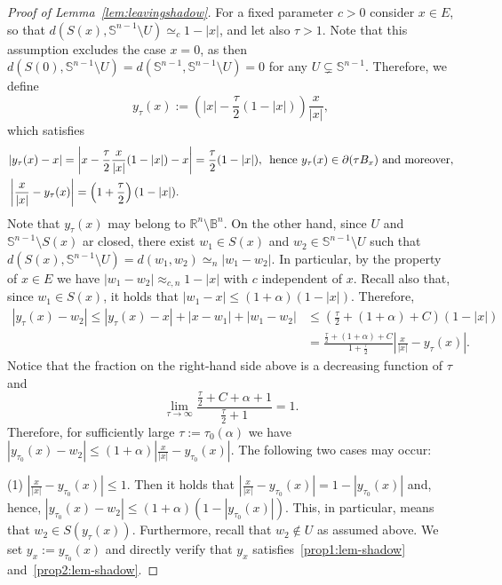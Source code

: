 \documentclass[11pt,a4paper,reqno]{amsart}
\theoremstyle{definition}
\newcommand{\B}{\mathbb{B}^n}
\newcommand{\Rn}{{\mathbb R}^n}
\newcommand{\Sn}{\mathbb{S}^{n-1}}
\numberwithin{komcounter}{section}
\begin{document}
\begin{appendix}
\begin{proof}[Proof of Lemma~\ref{lem:leavingshadow}]
	For a fixed parameter $c>0$ consider $x\in E$, so that $d(S(x),\Sn\setminus U)\simeq_c 1-|x|$, and let also $\tau >1$. Note that this assumption excludes the case $x=0$, as then $d(S(0),\Sn\setminus U)=d(\Sn,\Sn\setminus U)=0$ for any $U\subsetneq \Sn$. Therefore, we define
	\begin{equation}\label{def:y-tau}
	 y_\tau(x) :=\left( |x|-\frac{\tau}{2}(1-|x|)\right) \frac{x}{|x|},
	\end{equation}
	which satisfies 
	\begin{align*}
	&|y_\tau(x) -x|= \left| x- \frac{\tau}{2}\frac{x}{|x|}(1-|x|) -x \right| =\frac{\tau}{2}(1-|x|),\,\hbox{ hence } y_\tau(x)\in \partial(\tau B_x) \hbox{ and moreover},\\
	&\left|\frac{x}{|x|}-y_\tau(x)\right|=\left( 1+\frac{\tau}{2}\right) (1-|x|).
	\end{align*}
 Note that $y_{\tau}(x)$ may belong to $\Rn\setminus \B$.	
On the other hand, since $U$ and $\Sn\setminus S(x)$ ar closed, there exist $w_1\in S(x)$ and $w_2\in \Sn\setminus U$ such that $d(S(x),\Sn\setminus U)=d(w_1,w_2)\simeq_{n} |w_1-w_2|$. In particular, by the property of $x\in E$ we have $|w_1-w_2|\approx_{c, n} 1-|x|$ with $c$ independent of $x$. Recall also that, since $w_1\in S(x)$, it holds that $|w_1-x|\leq (1+\alpha)(1-|x|)$. Therefore,
\begin{align*}
	|y_\tau(x) -w_2|\leq |y_\tau(x) -x|+|x-w_1|+|w_1-w_2|&\leq \left( \frac{\tau}{2}+(1+\alpha)+C\right) (1-|x|)\\
	&= \frac{\frac{\tau}{2}+(1+\alpha)+C}{1+\frac{\tau}{2}}\left|\frac{x}{|x|}-y_\tau(x)\right|.
\end{align*}
Notice that the fraction on the right-hand side above is a decreasing function of $\tau$ and
$$
\lim_{\tau\to\infty }\frac{\frac{\tau}{2}+C+\alpha +1}{\frac{\tau}{2}+1}=1.
$$
Therefore, for sufficiently large $\tau:=\tau_0(\alpha)$ we have $|y_{\tau_0}(x)-w_2|\leq (1+\alpha )\left|\frac{x}{|x|}-y_{\tau_0}(x)\right|$. The following two cases may occur:
\smallskip

\noindent (1) $\left|\frac{x}{|x|}-y_{\tau_0}(x)\right|\leq 1$. Then it holds that $\left|\frac{x}{|x|}-y_{\tau_0}(x)\right|=1-|y_{\tau_0}(x)|$ and, hence, $|y_{\tau_0}(x)-w_2|\leq (1+\alpha)(1-|y_{\tau_0}(x)|)$. This, in particular, means that $w_2\in S(y_\tau(x))$. Furthermore, recall that $w_2\notin U$ as assumed above. We set $y_x:=y_{\tau_0}(x)$ and directly verify that $y_x$ satisfies~\eqref{prop1:lem-shadow} and~\eqref{prop2:lem-shadow}. 
\smallskip


\end{proof}
\end{appendix}
\end{document}
